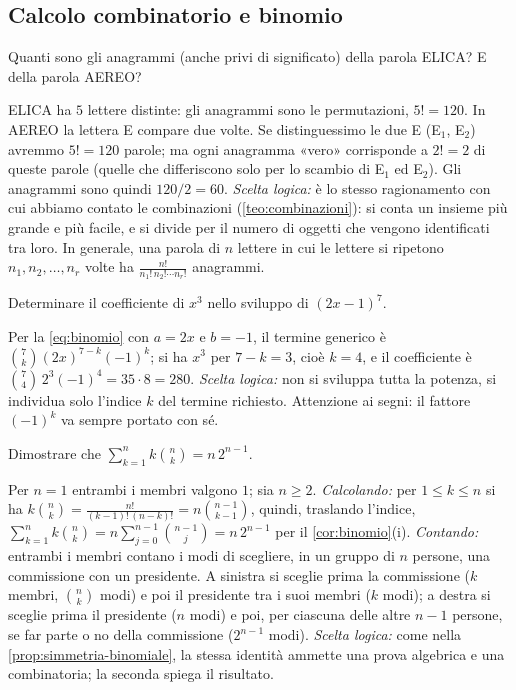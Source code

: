 \subsection*{Calcolo combinatorio e binomio}

\begin{esercizio}[Anagrammi]
Quanti sono gli anagrammi (anche privi di significato) della parola ELICA? E della
parola AEREO?
\begin{soluzione}
ELICA ha $5$ lettere distinte: gli anagrammi sono le permutazioni, $5!=120$. In AEREO la
lettera E compare due volte. Se distinguessimo le due E (E$_1$, E$_2$) avremmo $5!=120$
parole; ma ogni anagramma «vero» corrisponde a $2!=2$ di queste parole (quelle che
differiscono solo per lo scambio di E$_1$ ed E$_2$). Gli anagrammi sono quindi
$120/2=60$. \emph{Scelta logica:} è lo stesso ragionamento con cui abbiamo contato le
combinazioni (\cref{teo:combinazioni}): si conta un insieme più grande e più facile, e
si divide per il numero di oggetti che vengono identificati tra loro. In generale, una
parola di $n$ lettere in cui le lettere si ripetono $n_{1},n_{2},\dots,n_{r}$ volte ha
$\frac{n!}{n_{1}!\,n_{2}!\cdots n_{r}!}$ anagrammi.
\end{soluzione}
\end{esercizio}

\begin{esercizio}
Determinare il coefficiente di $x^{3}$ nello sviluppo di $(2x-1)^{7}$.
\begin{soluzione}
Per la \eqref{eq:binomio} con $a=2x$ e $b=-1$, il termine generico è
$\binom7k(2x)^{7-k}(-1)^{k}$; si ha $x^{3}$ per $7-k=3$, cioè $k=4$, e il coefficiente
è $\binom74\,2^{3}(-1)^{4}=35\cdot8=280$. \emph{Scelta logica:} non si sviluppa tutta la
potenza, si individua solo l'indice $k$ del termine richiesto. Attenzione ai segni: il
fattore $(-1)^{k}$ va sempre portato con sé.
\end{soluzione}
\end{esercizio}

\begin{esercizio}
Dimostrare che $\displaystyle\sum_{k=1}^{n}k\binom nk=n\,2^{n-1}$.
\begin{soluzione}
Per $n=1$ entrambi i membri valgono $1$; sia $n\ge2$.
\emph{Calcolando:} per $1\le k\le n$ si ha
$k\binom nk=\frac{n!}{(k-1)!\,(n-k)!}=n\binom{n-1}{k-1}$, quindi, traslando l'indice,
$\sum_{k=1}^{n}k\binom nk=n\sum_{j=0}^{n-1}\binom{n-1}{j}=n\,2^{n-1}$ per il
\cref{cor:binomio}(i). \emph{Contando:} entrambi i membri contano i modi di scegliere, in
un gruppo di $n$ persone, una commissione con un presidente. A sinistra si sceglie prima
la commissione ($k$ membri, $\binom nk$ modi) e poi il presidente tra i suoi membri ($k$
modi); a destra si sceglie prima il presidente ($n$ modi) e poi, per ciascuna delle
altre $n-1$ persone, se far parte o no della commissione ($2^{n-1}$ modi).
\emph{Scelta logica:} come nella \cref{prop:simmetria-binomiale}, la stessa identità
ammette una prova algebrica e una combinatoria; la seconda spiega il risultato.
\end{soluzione}
\end{esercizio}

